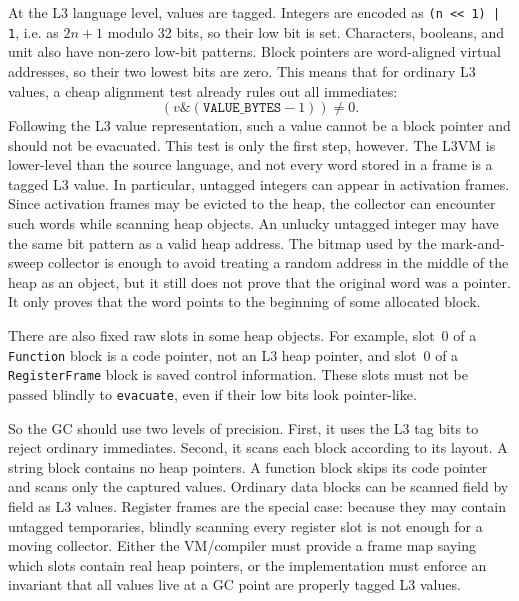 \documentclass[11pt]{article}
\begin{document}
At the L3 language level, values are tagged. Integers are encoded as \texttt{(n << 1) | 1}, i.e. as $2n+1$ modulo 32 bits, so their low bit is set. Characters, booleans, and unit also have non-zero low-bit patterns. Block pointers are word-aligned virtual addresses, so their two lowest bits are zero. This means that for ordinary L3 values, a cheap alignment test already rules out all immediates: \vspace{-0.5mm} \[ (v \mathbin{\&} (\texttt{VALUE\_BYTES} - 1)) \neq 0. \] \vspace{-0.5mm} Following the L3 value representation, such a value cannot be a block pointer and should not be evacuated. This test is only the first step, however. The L3VM is lower-level than the source language, and not every word stored in a frame is a tagged L3 value. In particular, untagged integers can appear in activation frames. Since activation frames may be evicted to the heap, the collector can encounter such words while scanning heap objects. An unlucky untagged integer may have the same bit pattern as a valid heap address. The bitmap used by the mark-and-sweep collector is enough to avoid treating a random address in the middle of the heap as an object, but it still does not prove that the original word was a pointer. It only proves that the word points to the beginning of some allocated block. 

There are also fixed raw slots in some heap objects. For example, slot~0 of a \texttt{Function} block is a code pointer, not an L3 heap pointer, and slot~0 of a \texttt{RegisterFrame} block is saved control information. These slots must not be passed blindly to \texttt{evacuate}, even if their low bits look pointer-like. 

So the GC should use two levels of precision. First, it uses the L3 tag bits to reject ordinary immediates. Second, it scans each block according to its layout. A string block contains no heap pointers. A function block skips its code pointer and scans only the captured values. Ordinary data blocks can be scanned field by field as L3 values. Register frames are the special case: because they may contain untagged temporaries, blindly scanning every register slot is not enough for a moving collector. Either the VM/compiler must provide a frame map saying which slots contain real heap pointers, or the implementation must enforce an invariant that all values live at a GC point are properly tagged L3 values.
\end{document}
